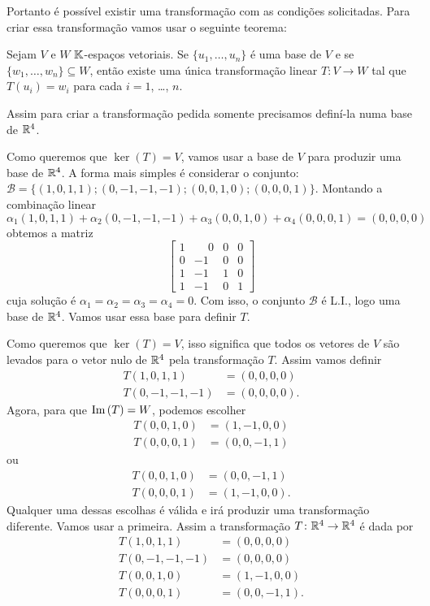 \documentclass[12pt]{exam}
\begin{document}
    Portanto é possível existir uma transformação com as condições solicitadas. Para criar essa transformação vamos usar o seguinte teorema:
    \begin{tcolorbox}[colback=green!30, colframe=green!80!blue, title=Teorema]
        Sejam $V$ e $W$ $\mathbb{K}$-espaços vetoriais. Se $\{u_1, \dots, u_n\}$ é uma base de $V$ e se $\{w_1, \dots, w_n\} \subseteq W$, então existe uma única transformação linear $T \colon V \to W$ tal que $T(u_i) = w_i$ para cada $i = 1$, \dots, $n$.
    \end{tcolorbox}

    Assim para criar a transformação pedida somente precisamos definí-la numa base de $\mathbb{R}^4$.

    Como queremos que $\ker(T) = V$, vamos usar a base de $V$ para produzir uma base de $\mathbb{R}^4$. A forma mais simples é considerar o conjunto: $\mathcal{B} = \{(1, 0, 1, 1); (0, -1, -1, -1); (0, 0, 1, 0); (0, 0, 0, 1)\}$. Montando a combinação linear
    \[
        \alpha_1(1, 0, 1, 1) + \alpha_2(0, -1, -1, -1) + \alpha_3(0, 0, 1, 0) + \alpha_4(0, 0, 0, 1) = (0, 0, 0, 0)
    \]
    obtemos a matriz
    \[
        \begin{bmatrix}
            1 & \phantom{-}0 & 0 & 0\\
            0 & -1 & 0 & 0\\
            1 & -1 & 1 & 0\\
            1 & -1 & 0 & 1
        \end{bmatrix}
    \]
    cuja solução é $\alpha_1 = \alpha_2 = \alpha_3 = \alpha_4 = 0$.
    Com isso, o conjunto $\mathcal{B}$ é L.I., logo uma base de $\mathbb{R}^4$. Vamos usar essa base para definir $T$.

    Como queremos que $\ker(T) = V$, isso significa que todos os vetores de $V$ são levados para o vetor nulo de $\mathbb{R}^4$ pela transformação $T$. Assim vamos definir
    \begin{align*}
        T(1, 0, 1, 1) &= (0, 0, 0, 0)\\
        T(0, -1, -1, -1) &= (0, 0, 0, 0).
    \end{align*}
    Agora, para que ${\rm Im\,}(T) = W$, podemos escolher
    \begin{align*}
        T(0, 0, 1, 0) &= (1, -1, 0, 0)\\
        T(0, 0, 0, 1) &= (0, 0, -1, 1)
    \end{align*}
    ou
    \begin{align*}
        T(0, 0, 1, 0) &= (0, 0, -1, 1)\\
        T(0, 0, 0, 1) &= (1, -1, 0, 0).
    \end{align*}
    Qualquer uma dessas escolhas é válida e irá produzir uma transformação diferente. Vamos usar a primeira. Assim a transformação $T \colon \mathbb{R}^4 \to \mathbb{R}^4$ é dada por
    \begin{align*}
        T(1, 0, 1, 1) &= (0, 0, 0, 0)\\
        T(0, -1, -1, -1) &= (0, 0, 0, 0)\\
        T(0, 0, 1, 0) &= (1, -1, 0, 0)\\
        T(0, 0, 0, 1) &= (0, 0, -1, 1).
    \end{align*}
\end{document}
